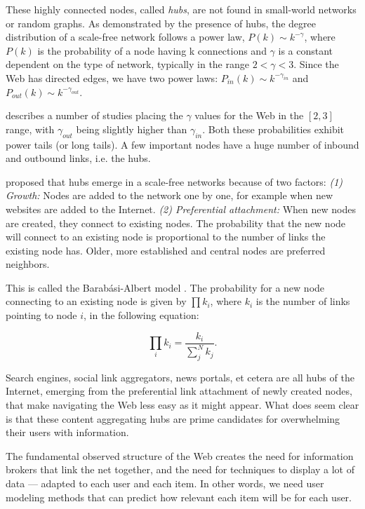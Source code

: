 These highly connected nodes, called \emph{hubs}, are not found in small-world networks or random graphs. As demonstrated by the presence of hubs, the degree distribution of a scale-free network follows a power law, 
$P(k) \sim k^{-\gamma}$, 
where $P(k)$ is the probability of a node having k connections and $\gamma$ is a constant dependent on the type of network, typically in the range $2 < \gamma < 3$. 
Since the Web has directed edges,
we have two power laws:
$P_{in}(k) \sim k^{-\gamma_{in}}$ and 
$P_{out}(k) \sim k^{-\gamma_{out}}$.

\cite{Albert1999} describes a number of studies placing the $\gamma$ values for the Web in the $[2,3]$ range, 
with $\gamma_{out}$ being slightly higher than $\gamma_{in}$. 
Both these probabilities exhibit power tails (or long tails). 
A few important nodes have a huge number of inbound and outbound links, i.e. the hubs. 

\citet[p86]{Barabasi2003} proposed that hubs emerge in a scale-free networks because of two factors:
\emph{(1) Growth:} Nodes are added to the network one by one, for example when new websites are added to the Internet.
\emph{(2) Preferential attachment:} When new nodes are created, they connect to existing nodes. The probability that the new node will connect to an existing node is proportional to the number of links the existing node has. Older, more established and central nodes are preferred neighbors.

This is called the Barab\'{a}si-Albert model \citep{Albert1999}. 
The probability for a new node connecting to an existing node is given by $\prod k_i$, 
where $k_i$ is the number of links pointing to node $i$, in the following equation: 

\begin{equation*}
  \prod_{i} k_i  = \frac{k_i}{\sum_{j}^N k_j}.
\end{equation*} 

Search engines, social link aggregators, news portals, et cetera are all hubs of the Internet, emerging from the preferential 
link attachment of newly created nodes, that make navigating the Web less easy as it might appear.
What does seem clear is that these content aggregating hubs are prime candidates for overwhelming their users with information. 

The fundamental observed structure of the Web creates the need for information brokers that link the net together, 
and the need for techniques to display a lot of data --- adapted to each user and each item.
In other words, we need user modeling methods that can predict how relevant each item will be for each user.


 


